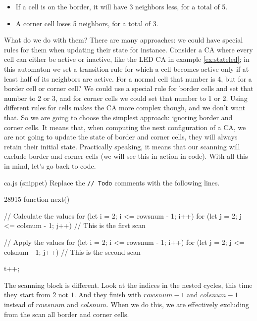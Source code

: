 \begin{itemize}
\item If a cell is on the border, it will have 3 neighbors less, for a total of 5.
\item A corner cell loses 5 neighbors, for a total of 3.
\end{itemize}

What do we do with them? There are many approaches: we could have special rules for them when updating their
state for instance. Consider a CA where every cell can either be active or inactive, like the LED CA in
example \ref{ex:stateled}; in this automaton we set a transition rule for which 
a cell becomes active only if at least half of its neighbors are active. For a
normal cell that number is 4, but for a border cell or corner cell? We could use a special rule for border
cells and set that number to 2 or 3, and for corner cells we could set that number to 1 or 2.
Using different rules for cells makes the CA more complex though, and we don't want that.
So we are going to
choose the simplest approach: ignoring border and corner cells. It means that, when computing the next
configuration of a CA, we are not going to update the state of border and corner cells, they will always retain their initial state. Practically speaking, it means that our scanning will exclude border and corner cells
(we will see this in action in code). With all this in mind, let's go back to code.

\begin{programcode}{ca.js (snippet)}
Replace the \texttt{// Todo} comments with the following lines.
\begin{codeh2}{2}{8}{9}{15}
function next() {
    // Calculate the values
    for (let i = 2; i <= rowsnum - 1; i++) {
      for (let j = 2; j <= colsnum - 1; j++) {
        // This is the first scan
      }
    }

    // Apply the values
    for (let i = 2; i <= rowsnum - 1; i++) {
      for (let j = 2; j <= colsnum - 1; j++) {
        // This is the second scan
      }
    }

    t++;
}
\end{codeh2}
\end{programcode}

The scanning block is different. Look at the indices in the nested cycles, this time they start from
$2$ not $1$. And they finish with $rowsnum - 1$ and $colsnum - 1$ instead of $rowsnum$ and $colsnum$.
When we do this, we are effectively excluding from the scan all border and corner cells.

